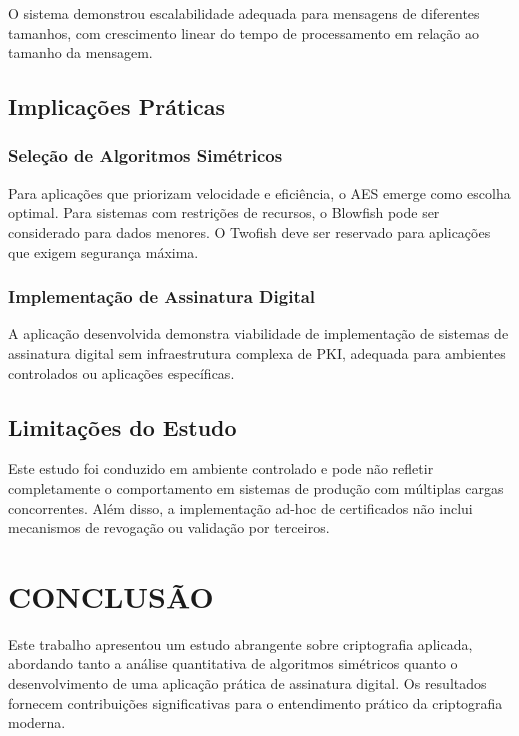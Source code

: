 \documentclass[12pt,a4paper,oneside]{article}
\begin{document}
O sistema demonstrou escalabilidade adequada para mensagens de diferentes tamanhos, com crescimento linear do tempo de processamento em relação ao tamanho da mensagem.

\subsection{Implicações Práticas}

\subsubsection{Seleção de Algoritmos Simétricos}

Para aplicações que priorizam velocidade e eficiência, o AES emerge como escolha optimal. Para sistemas com restrições de recursos, o Blowfish pode ser considerado para dados menores. O Twofish deve ser reservado para aplicações que exigem segurança máxima.

\subsubsection{Implementação de Assinatura Digital}

A aplicação desenvolvida demonstra viabilidade de implementação de sistemas de assinatura digital sem infraestrutura complexa de PKI, adequada para ambientes controlados ou aplicações específicas.

\subsection{Limitações do Estudo}

Este estudo foi conduzido em ambiente controlado e pode não refletir completamente o comportamento em sistemas de produção com múltiplas cargas concorrentes. Além disso, a implementação ad-hoc de certificados não inclui mecanismos de revogação ou validação por terceiros.

\section{CONCLUSÃO}

Este trabalho apresentou um estudo abrangente sobre criptografia aplicada, abordando tanto a análise quantitativa de algoritmos simétricos quanto o desenvolvimento de uma aplicação prática de assinatura digital. Os resultados fornecem contribuições significativas para o entendimento prático da criptografia moderna.
\end{document}
